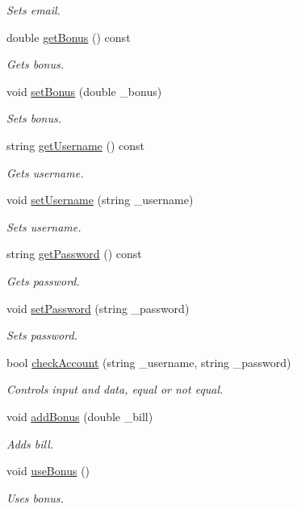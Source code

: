 \begin{DoxyCompactItemize}
\begin{DoxyCompactList}\small\item\em Sets email. \end{DoxyCompactList}\item 
double \hyperlink{classCustomer_ab4db4b8214793eaf6ddc8597ac8daf1b}{get\+Bonus} () const
\begin{DoxyCompactList}\small\item\em Gets bonus. \end{DoxyCompactList}\item 
void \hyperlink{classCustomer_af983714f01880a3f082c60443fcea84d}{set\+Bonus} (double \+\_\+bonus)
\begin{DoxyCompactList}\small\item\em Sets bonus. \end{DoxyCompactList}\item 
string \hyperlink{classCustomer_aebc1f8d2d749c3f5d132becad88dcbc6}{get\+Username} () const
\begin{DoxyCompactList}\small\item\em Gets username. \end{DoxyCompactList}\item 
void \hyperlink{classCustomer_ab794d5fb843d86eeb79c79dab75302f6}{set\+Username} (string \+\_\+username)
\begin{DoxyCompactList}\small\item\em Sets username. \end{DoxyCompactList}\item 
string \hyperlink{classCustomer_aec5721d16ce287c363cc1aacf5f962fd}{get\+Password} () const
\begin{DoxyCompactList}\small\item\em Gets password. \end{DoxyCompactList}\item 
void \hyperlink{classCustomer_a87953a93ed8a81f9835d26d2ecf3742a}{set\+Password} (string \+\_\+password)
\begin{DoxyCompactList}\small\item\em Sets password. \end{DoxyCompactList}\item 
bool \hyperlink{classCustomer_ae1e9fb03ed6179ecbcd6c0212bc7de17}{check\+Account} (string \+\_\+username, string \+\_\+password)
\begin{DoxyCompactList}\small\item\em Controls input and data, equal or not equal. \end{DoxyCompactList}\item 
void \hyperlink{classCustomer_a6bd365c7ee7c4807de7e0fb94b4a9687}{add\+Bonus} (double \+\_\+bill)
\begin{DoxyCompactList}\small\item\em Adds bill. \end{DoxyCompactList}\item 
void \hyperlink{classCustomer_ab5a0e54395ef83bef1f51a3a98b30ec4}{use\+Bonus} ()
\begin{DoxyCompactList}\small\item\em Uses bonus. \end{DoxyCompactList}\end{DoxyCompactItemize}
